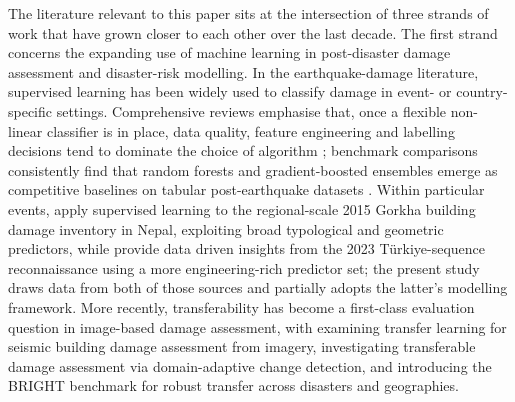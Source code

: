 \documentclass[11pt,a4paper]{article}
\begin{document}
The literature relevant to this paper sits at the intersection of three strands of work that have grown closer to each other over the last decade. 
The first strand concerns the expanding use of machine learning in post-disaster damage assessment and disaster-risk
modelling. In the earthquake-damage literature, supervised learning has been widely used to classify damage in event- or country-specific settings. Comprehensive reviews emphasise that, once a flexible non-linear classifier is in place, data quality, feature engineering and labelling decisions tend to dominate the choice of algorithm \citep{xie2020review}; benchmark comparisons consistently find that random forests and gradient-boosted ensembles emerge as competitive baselines on tabular post-earthquake datasets \citep{mangalathu2020classifying, breiman2001randomforests, ke2017lightgbm}. Within particular events, \citet{ghimire2022nepal} apply supervised learning to the regional-scale 2015 Gorkha building damage inventory in Nepal, exploiting broad typological and geometric predictors, while \citet{hariri2025turkiye} provide data driven insights from the 2023 T\"urkiye-sequence reconnaissance using a more engineering-rich predictor set; the present study draws data from both of those sources and partially adopts the latter's modelling framework. More recently, transferability has become a first-class evaluation question in image-based damage assessment, with \citet{lin2022transfer} examining transfer learning for seismic building damage assessment from imagery, \citet{zheng2024transferable} investigating transferable damage assessment via domain-adaptive change detection, and \citet{chen2025bright} introducing the BRIGHT benchmark for robust transfer across disasters and geographies.
\end{document}
